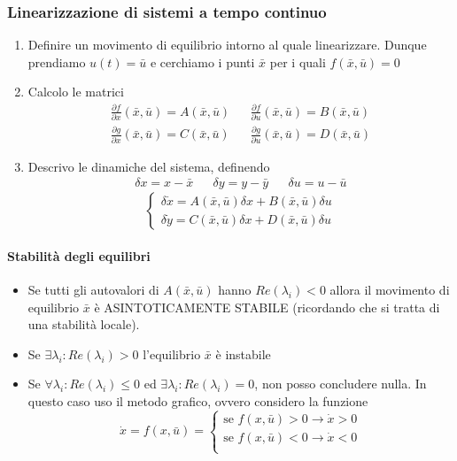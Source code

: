 \documentclass{article}
\begin{document}
	\subsubsection{Linearizzazione di sistemi a tempo continuo}
	\begin{enumerate}
		\item Definire un movimento di equilibrio intorno al quale linearizzare. Dunque prendiamo $u(t) = \bar{u}$ e cerchiamo i punti $\bar{x}$ per i quali $f(\bar{x}, \bar{u}) = 0$
		\item Calcolo le matrici
			\begin{align}
				\frac{\partial f}{\partial x}(\bar{x}, \bar{u}) = A(\bar{x}, \bar{u}) &&
				\frac{\partial f}{\partial u}(\bar{x}, \bar{u}) = B(\bar{x}, \bar{u}) \\
				\frac{\partial g}{\partial x}(\bar{x}, \bar{u}) = C(\bar{x}, \bar{u}) &&
				\frac{\partial g}{\partial u}(\bar{x}, \bar{u}) = D(\bar{x}, \bar{u})
			\end{align}
		\item Descrivo le dinamiche del sistema, definendo
			\begin{align}
				\delta x = x - \bar{x} && \delta y = y - \bar{y} && \delta u = u - \bar{u}
			\end{align}
			\begin{equation}
				\begin{cases}
					\delta\dot{x} = A(\bar{x}, \bar{u})\delta x + B(\bar{x}, \bar{u})\delta u \\
					\delta\dot{y} = C(\bar{x}, \bar{u})\delta x + D(\bar{x}, \bar{u})\delta u
				\end{cases}
			\end{equation}
	\end{enumerate}	
	\paragraph{Stabilità degli equilibri}
	\begin{itemize}
		\item Se tutti gli autovalori di $A(\bar{x}, \bar{u})$ hanno $Re(\lambda_i) < 0$ allora il movimento di equilibrio $\bar{x}$ è ASINTOTICAMENTE STABILE (ricordando che si tratta di una stabilità locale).
		\item Se $\exists \lambda_i : Re(\lambda_i) > 0$ l'equilibrio $\bar{x}$ è instabile 
		\item Se $\forall \lambda_i : Re(\lambda_i) \leq 0$ ed $\exists \lambda_i : Re(\lambda_i) = 0$, non posso concludere nulla. In questo caso uso il metodo grafico, ovvero considero la funzione
		\begin{equation}
			\dot{x} = f(x, \bar{u}) = 
			\begin{cases}
				\mbox{se } f(x, \bar{u}) > 0 \rightarrow \dot{x} > 0 \\
				\mbox{se } f(x, \bar{u}) < 0 \rightarrow \dot{x} < 0 \\
			\end{cases}
		\end{equation}
	\end{itemize}
\end{document}
